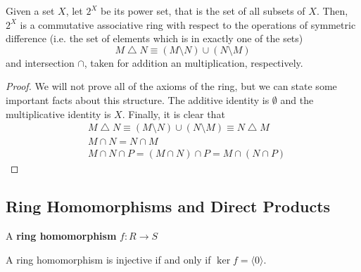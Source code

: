   \begin{theorem}
    Given a set $X$, let $2^X$ be its power set, that is the set of all subsets of $X$. Then, $2^X$ is a commutative associative ring with respect to the operations of symmetric difference (i.e. the set of elements which is in exactly one of the sets) 
    \begin{equation}
      M \bigtriangleup N \equiv (M \setminus N) \cup (N \setminus M)
    \end{equation}
    and intersection $\cap$, taken for addition an multiplication, respectively. 
  \end{theorem}
  \begin{proof}
    We will not prove all of the axioms of the ring, but we can state some important facts about this structure. The additive identity is $\emptyset$ and the multiplicative identity is $X$. Finally, it is clear that 
    \begin{align*}
      & M \bigtriangleup N \equiv (M \setminus N) \cup (N \setminus M) \equiv N \bigtriangleup M \\
      & M \cap N = N \cap M \\
      & M \cap N \cap P = (M \cap N) \cap P = M \cap (N \cap P)
    \end{align*}
  \end{proof}  

\subsection{Ring Homomorphisms and Direct Products} 

  \begin{definition}
    A \textbf{ring homomorphism} $f: R \rightarrow S$ 
  \end{definition} 

  \begin{lemma}
    A ring homomorphism is injective if and only if $\ker{f} = \langle 0 \rangle $. 
  \end{lemma} 

  \begin{theorem}
    
  \end{theorem}
  
  \begin{definition}
    
  \end{definition}

